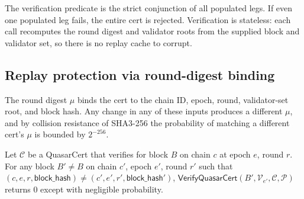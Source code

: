 The verification predicate is the strict conjunction of all populated
legs. If even one populated leg fails, the entire cert is rejected.
Verification is stateless: each call recomputes the round digest and
validator roots from the supplied block and validator set, so there
is no replay cache to corrupt.

\subsection{Replay protection via round-digest binding}

The round digest $\mu$ binds the cert to the chain ID, epoch, round,
validator-set root, and block hash. Any change in any of these inputs
produces a different $\mu$, and by collision resistance of SHA3-256
the probability of matching a different cert's $\mu$ is bounded by
$2^{-256}$.

\begin{theorem}
\label{thm:replay}
Let $\mathcal{C}$ be a QuasarCert that verifies for block $B$ on chain
$c$ at epoch $e$, round $r$. For any block $B' \neq B$ on chain $c'$,
epoch $e'$, round $r'$ such that $(c, e, r, \mathsf{block\_hash}) \neq
(c', e', r', \mathsf{block\_hash'})$,
$\textsf{VerifyQuasarCert}(B', \mathcal{V}_{e'}, \mathcal{C}, \mathcal{P})$
returns $0$ except with negligible probability.
\end{theorem}

